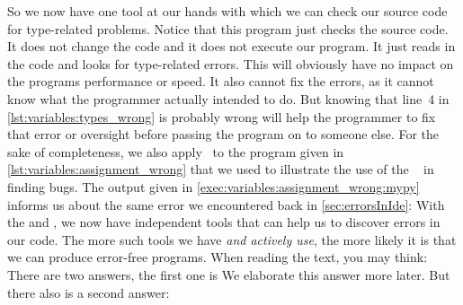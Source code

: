 So we now have one tool at our hands with which we can check our source code for type-related problems.
Notice that this program just checks the source code.
It does not change the code and it does not execute our program.
It just reads in the code and looks for type-related errors.
This will obviously have no impact on the programs performance or speed.
It also cannot fix the errors, as it cannot know what the programmer actually intended to do.
But knowing that line~4 in \cref{lst:variables:types_wrong} is probably wrong will help the programmer to fix that error or oversight before passing the program on to someone else.%
%
%
%
%
%
%
For the sake of completeness, we also apply \mypy\ to the program  given in \cref{lst:variables:assignment_wrong} that we used to illustrate the use of the \pycharm\  in finding bugs.
The output given in \cref{exec:variables:assignment_wrong:mypy} informs us about the same error we encountered back in \cref{sec:errorsInIde}:
\emph{}
With the  and \mypy, we now have independent tools that can help us to discover errors in our code.
The more such tools we have \emph{and actively use}, the more likely it is that we can produce error-free programs.
%
When reading the text, you may think:
\emph{}
There are two answers, the first one is \emph{}
We elaborate this answer more later.
But there also is a second answer:%
%
%
